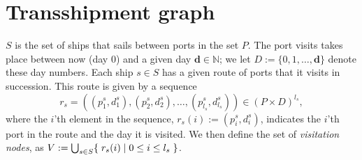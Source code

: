 %
%
\section*{Transshipment graph}
$S$ is the set of ships that sails between ports in the set $P$.  
The port visits takes place between now (day $0$) and a given day $\mathbf{d}\in \mathbb{N}$; we let $D := \{0,1,\ldots, \mathbf{d}\}$ denote these day numbers.
%
Each ship $s\in S$ has a given route of ports that it visits in succession. This route is given by a sequence 
\[
r_s = ((p^s_1, d^s_1), (p^s_2, d^s_2), \ldots, (p^s_{l_s},d^s_{l_s}))\in (P\times D)^{l_s},
\]
where the $i$'th element in the sequence, $r_s(i) := (p^s_i, d^s_i)$, indicates the $i$'th port in the route and the day it is visited.
%
We then define the set of \emph{visitation nodes}, as $V := \bigcup_{s\in S}\{\;{r_s(i)}\;|\;{0\leq i\leq l_s}\;\}$.

